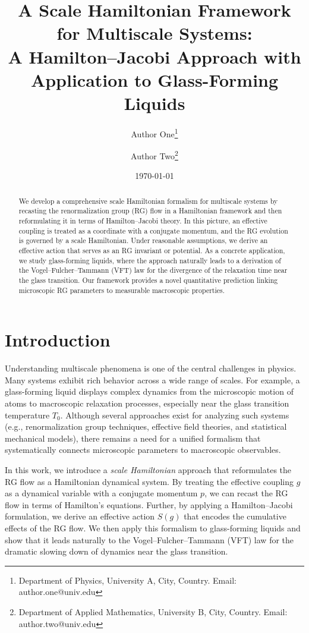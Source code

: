 \documentclass[12pt]{article}
\title{A Scale Hamiltonian Framework for Multiscale Systems: \\ A Hamilton--Jacobi Approach with Application to Glass-Forming Liquids}
\author{Author One\thanks{Department of Physics, University A, City, Country. Email: author.one@univ.edu} \and Author Two\thanks{Department of Applied Mathematics, University B, City, Country. Email: author.two@univ.edu}}
\date{\today}
\begin{document}
\maketitle

\begin{abstract}
We develop a comprehensive scale Hamiltonian formalism for multiscale systems by recasting the renormalization group (RG) flow in a Hamiltonian framework and then reformulating it in terms of Hamilton--Jacobi theory. In this picture, an effective coupling is treated as a coordinate with a conjugate momentum, and the RG evolution is governed by a scale Hamiltonian. Under reasonable assumptions, we derive an effective action that serves as an RG invariant or potential. As a concrete application, we study glass-forming liquids, where the approach naturally leads to a derivation of the Vogel--Fulcher--Tammann (VFT) law for the divergence of the relaxation time near the glass transition. Our framework provides a novel quantitative prediction linking microscopic RG parameters to measurable macroscopic properties.
\end{abstract}

\section{Introduction}
Understanding multiscale phenomena is one of the central challenges in physics. Many systems exhibit rich behavior across a wide range of scales. For example, a glass-forming liquid displays complex dynamics from the microscopic motion of atoms to macroscopic relaxation processes, especially near the glass transition temperature \(T_0\). Although several approaches exist for analyzing such systems (e.g., renormalization group techniques, effective field theories, and statistical mechanical models), there remains a need for a unified formalism that systematically connects microscopic parameters to macroscopic observables.

In this work, we introduce a \emph{scale Hamiltonian} approach that reformulates the RG flow as a Hamiltonian dynamical system. By treating the effective coupling \(g\) as a dynamical variable with a conjugate momentum \(p\), we can recast the RG flow in terms of Hamilton's equations. Further, by applying a Hamilton--Jacobi formulation, we derive an effective action \(S(g)\) that encodes the cumulative effects of the RG flow. We then apply this formalism to glass-forming liquids and show that it leads naturally to the Vogel--Fulcher--Tammann (VFT) law for the dramatic slowing down of dynamics near the glass transition.
\end{document}
